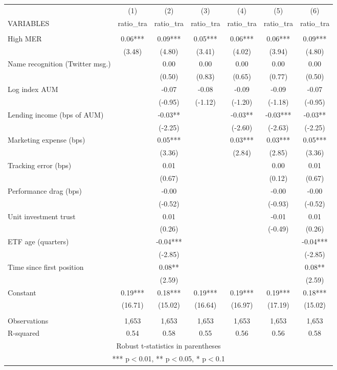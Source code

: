 \documentclass[]{article}
\begin{document}
\begin{tabular}{lcccccc} \hline
 & (1) & (2) & (3) & (4) & (5) & (6) \\
VARIABLES & ratio\_tra & ratio\_tra & ratio\_tra & ratio\_tra & ratio\_tra & ratio\_tra \\ \hline
 &  &  &  &  &  &  \\
High MER & 0.06*** & 0.09*** & 0.05*** & 0.06*** & 0.06*** & 0.09*** \\
 & (3.48) & (4.80) & (3.41) & (4.02) & (3.94) & (4.80) \\
Name recognition (Twitter msg.) &  & 0.00 & 0.00 & 0.00 & 0.00 & 0.00 \\
 &  & (0.50) & (0.83) & (0.65) & (0.77) & (0.50) \\
Log index AUM &  & -0.07 & -0.08 & -0.09 & -0.09 & -0.07 \\
 &  & (-0.95) & (-1.12) & (-1.20) & (-1.18) & (-0.95) \\
Lending income (bps of AUM) &  & -0.03** &  & -0.03** & -0.03*** & -0.03** \\
 &  & (-2.25) &  & (-2.60) & (-2.63) & (-2.25) \\
Marketing expense (bps) &  & 0.05*** &  & 0.03*** & 0.03*** & 0.05*** \\
 &  & (3.36) &  & (2.84) & (2.85) & (3.36) \\
Tracking error (bps) &  & 0.01 &  &  & 0.00 & 0.01 \\
 &  & (0.67) &  &  & (0.12) & (0.67) \\
Performance drag (bps) &  & -0.00 &  &  & -0.00 & -0.00 \\
 &  & (-0.52) &  &  & (-0.93) & (-0.52) \\
Unit investment trust &  & 0.01 &  &  & -0.01 & 0.01 \\
 &  & (0.26) &  &  & (-0.49) & (0.26) \\
ETF age (quarters) &  & -0.04*** &  &  &  & -0.04*** \\
 &  & (-2.85) &  &  &  & (-2.85) \\
Time since first position &  & 0.08** &  &  &  & 0.08** \\
 &  & (2.59) &  &  &  & (2.59) \\
Constant & 0.19*** & 0.18*** & 0.19*** & 0.19*** & 0.19*** & 0.18*** \\
 & (16.71) & (15.02) & (16.64) & (16.97) & (17.19) & (15.02) \\
 &  &  &  &  &  &  \\
Observations & 1,653 & 1,653 & 1,653 & 1,653 & 1,653 & 1,653 \\
 R-squared & 0.54 & 0.58 & 0.55 & 0.56 & 0.56 & 0.58 \\ \hline
\multicolumn{7}{c}{ Robust t-statistics in parentheses} \\
\multicolumn{7}{c}{ *** p$<$0.01, ** p$<$0.05, * p$<$0.1} \\
\end{tabular}
\end{document}

